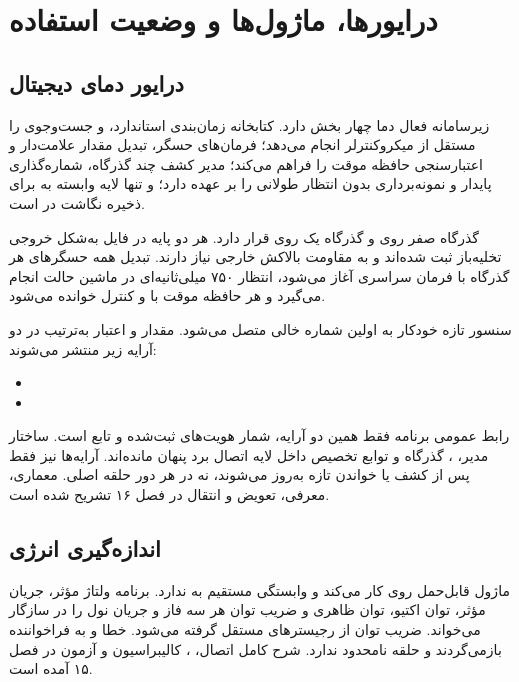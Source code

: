 \chapter{درایورها، ماژول‌ها و وضعیت استفاده}

\section{درایور دمای دیجیتال}
زیرسامانه فعال دما چهار بخش دارد. کتابخانه
زمان‌بندی استاندارد،  و جست‌وجوی  را مستقل از میکروکنترلر انجام می‌دهد؛
فرمان‌های حسگر، تبدیل مقدار علامت‌دار و اعتبارسنجی حافظه موقت را فراهم می‌کند؛ مدیر
کشف چند گذرگاه، شماره‌گذاری پایدار و نمونه‌برداری بدون انتظار طولانی را بر عهده دارد؛ و
تنها لایه وابسته به  برای ذخیره نگاشت در  است.

گذرگاه صفر روی  و گذرگاه یک روی  قرار دارد. هر دو پایه در فایل  به‌شکل خروجی تخلیه‌باز ثبت شده‌اند و به مقاومت بالاکش خارجی نیاز دارند. تبدیل همه حسگرهای هر گذرگاه با فرمان سراسری آغاز می‌شود، انتظار ۷۵۰ میلی‌ثانیه‌ای در ماشین حالت انجام می‌گیرد و هر حافظه موقت با  و کنترل  خوانده می‌شود.

سنسور تازه خودکار به اولین شماره خالی متصل می‌شود. مقدار و اعتبار به‌ترتیب در دو آرایه زیر منتشر می‌شوند:
\begin{itemize}
  \item {}
  \item {}
\end{itemize}

رابط عمومی برنامه فقط همین دو آرایه، شمار هویت‌های ثبت‌شده و تابع
است. ساختار مدیر، ، گذرگاه و توابع تخصیص داخل لایه اتصال برد پنهان مانده‌اند. آرایه‌ها نیز فقط پس از کشف یا خواندن تازه به‌روز می‌شوند، نه در هر دور حلقه اصلی. معماری، معرفی، تعویض و انتقال در فصل ۱۶ تشریح شده است.

\section{اندازه‌گیری انرژی}
ماژول قابل‌حمل
روی
کار می‌کند و وابستگی مستقیم به  ندارد. برنامه ولتاژ مؤثر، جریان مؤثر، توان اکتیو، توان ظاهری و ضریب توان هر سه فاز و جریان نول را در  سازگار می‌خواند. ضریب توان از رجیسترهای مستقل
گرفته می‌شود. خطا و  به فراخواننده بازمی‌گردند و  حلقه نامحدود ندارد. شرح کامل اتصال، ، کالیبراسیون و آزمون در فصل ۱۵ آمده است.

